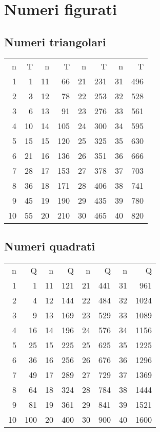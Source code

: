 \chapter{Numeri figurati}
\section{Numeri triangolari}
\begin{center}
	
\end{center}
\begin{center}
	\begin{tabular}{*{8}{R} }
\toprule
n&T&n&T&n&T&n&T\\
1&1&11&66&21&231&31&496\\
2&3&12&78&22&253&32&528\\
3&6&13&91&23&276&33&561\\
4&10&14&105&24&300&34&595\\
5&15&15&120&25&325&35&630\\
6&21&16&136&26&351&36&666\\
7&28&17&153&27&378&37&703\\
8&36&18&171&28&406&38&741\\
9&45&19&190&29&435&39&780\\
10&55&20&210&30&465&40&820\\
\bottomrule
\end{tabular} 
\end{center}
\section{Numeri quadrati}
\begin{center}

\end{center}
\begin{center}
	\begin{tabular}{*{8}{R} }
		\toprule
		n&Q&n&Q&n&Q&n&Q\\
		1&1&11&121&21&441&31&961\\
		2&4&12&144&22&484&32&1024\\
		3&9&13&169&23&529&33&1089\\
		4&16&14&196&24&576&34&1156\\
		5&25&15&225&25&625&35&1225\\
		6&36&16&256&26&676&36&1296\\
		7&49&17&289&27&729&37&1369\\
		8&64&18&324&28&784&38&1444\\
		9&81&19&361&29&841&39&1521\\
		10&100&20&400&30&900&40&1600\\
		\bottomrule
	\end{tabular} 
\end{center}
